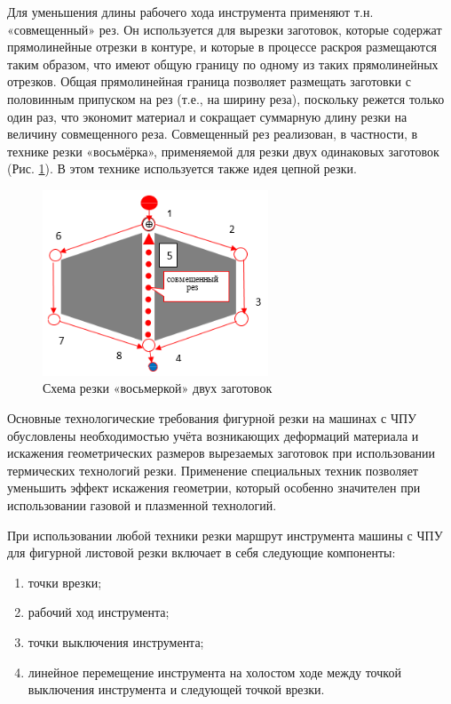 \documentclass{article}
\begin{document}
Для уменьшения длины рабочего хода инструмента
применяют т.н. «совмещенный» рез.
Он используется для вырезки заготовок,
которые содержат прямолинейные отрезки в контуре,
и которые в процессе раскроя размещаются таким образом,
что имеют общую границу по одному из таких прямолинейных отрезков.
Общая прямолинейная граница позволяет размещать
заготовки с половинным припуском на рез
(т.е., на ширину реза),
поскольку режется только один раз,
что экономит материал и сокращает суммарную
длину резки на величину совмещенного реза.
Совмещенный рез реализован, в частности,
в технике резки «восьмёрка»,
применяемой для резки двух одинаковых заготовок
(Рис. \ref{8}).
В этом технике используется также идея цепной резки.

\begin{figure}
  \begin{center}
  \includegraphics[width=0.6\textwidth]{8.png}
  \caption{Схема резки «восьмеркой» двух заготовок}
  \label{8}
  \end{center}
\end{figure}

Основные технологические требования
фигурной резки на машинах с ЧПУ обусловлены
необходимостью учёта возникающих деформаций
материала и искажения геометрических размеров
вырезаемых заготовок при использовании
термических технологий резки.
Применение специальных техник позволяет
уменьшить эффект искажения геометрии,
который особенно значителен при
использовании газовой и плазменной технологий.

При использовании любой техники резки маршрут инструмента
машины с ЧПУ для фигурной листовой резки
включает в себя следующие компоненты:
\begin{enumerate}
  \item точки врезки;
  \item рабочий ход инструмента;
  \item точки выключения инструмента;
  \item линейное перемещение инструмента на холостом ходе
  между точкой выключения инструмента и следующей точкой врезки.
\end{enumerate}
\end{document}
